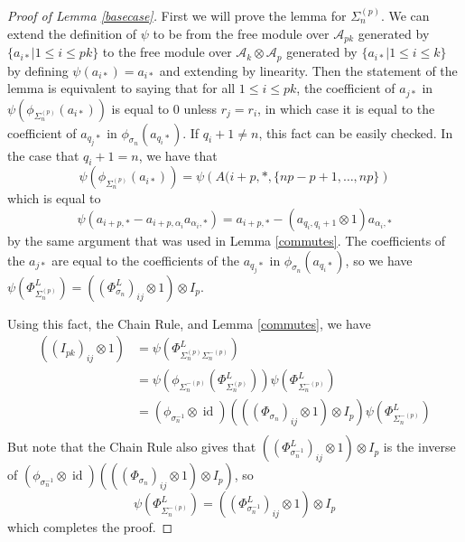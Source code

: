 \documentclass[11pt]{amsart}
\def\ltblue{blue!20!white}
\def\A{{\mathcal A}}
\def\s{{\sigma}}
\def\a{\alpha}
\newcommand\id{\operatorname{id}}
\newcommand\Sp{\Sigma^{(p)}}
\newcommand\SpM{\Sigma^{-(p)}}
\begin{document}
\begin{proof} [Proof of Lemma \ref{basecase}]\todo[color=\ltblue]{check}
First we will prove the lemma for $\Sp_n$.  We can extend the definition of $\psi$ to be from the free module over $\A_{pk}$ generated by $\{a_{i*}|1\le i\le pk\}$ to the free module over $\A_{k}\otimes \A_{p}$ generated by $\{a_{i*}|1\le i\le k\}$ by defining $\psi(a_{i*}) = a_{i*}$ and extending by linearity.  Then the statement of the lemma is equivalent to saying that for all $1\le i\le pk$, the coefficient of $a_{j*}$ in $\psi\left(\phi_{\Sp_n}(a_{i*})\right)$ is equal to 0 unless $r_j = r_i$, in which case it is equal to the coefficient of $a_{q_j*}$ in $\phi_{\s_n}(a_{q_i*})$.  If $q_i + 1 \ne n$, this fact can be easily checked.  In the case that $q_i + 1 = n$, we have that
$$\psi\left(\phi_{\Sp_n}(a_{i*})\right) = \psi\left(A(i+p,*,\{np-p+1,\ldots,np\}\right)$$
\noindent which is equal to
$$\psi(a_{i+p,*} - a_{i+p,\a_i}a_{\a_i,*}) = a_{i+p,*} - (a_{q_i,q_i+1}\otimes 1)a_{\a_i,*}$$
by the same argument that was used in Lemma \ref{commutes}.  The coefficients of the $a_{j*}$ are equal to the coefficients of the $a_{q_j*}$ in $\phi_{\s_n}(a_{q_i*})$, so we have $\psi\left(\Phi_{\Sp_n}^L\right) = \left(\left(\Phi_{\s_n}^L\right)_{ij}\otimes 1\right)\otimes I_p$.

Using this fact, the Chain Rule, and Lemma \ref{commutes}, we have
\begin{align*}
\left(\left(I_{pk}\right)_{ij}\otimes 1\right) &= \psi\left(\Phi_{\Sp_n\SpM_n}^L\right)\\
&= \psi\left(\phi_{\SpM_n}\left(\Phi_{\Sp_n}^L\right)\right)\psi\left(\Phi_{\SpM_n}^L\right)\\
&= \left(\phi_{\s_n^{-1}}\otimes \id\right)\left(\left(\left(\Phi_{\s_n}\right)_{ij}\otimes 1\right)\otimes I_p\right)\psi\left(\Phi_{\SpM_n}^L\right)\\
\end{align*}
But note that the Chain Rule also gives that $\left(\left(\Phi_{\s_n^{-1}}^L\right)_{ij}\otimes 1\right)\otimes I_p$ is the inverse of $\left(\phi_{\s_n^{-1}}\otimes \id\right)\left(\left(\left(\Phi_{\s_n}\right)_{ij}\otimes 1\right)\otimes I_p\right)$, so 
$$\psi\left(\Phi_{\SpM_n}^L\right) = \left(\left(\Phi_{\s_n^{-1}}^L\right)_{ij}\otimes 1\right)\otimes I_p$$
\noindent which completes the proof.
\end{proof}
\end{document}
